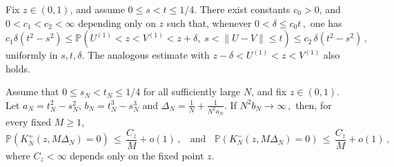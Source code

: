 \documentclass[10pt,a4paper]{amsart}
\newcommand{\PP}{\mathbb P}
\begin{document}
\begin{lemma} \label{lem:local-endpoint}
    Fix \(z\in (0,1)\), and assume \(0\le s<t\le 1/4\).  There exist constants \(c_0>0\), and \(0<c_1<c_2<\infty\) depending only on $z$ such that, whenever
    \(
        0<\delta\le c_0t \, ,
    \)
    one has
    \begin{equation} \label{eq-local-ep}
        c_1\delta(t^2-s^2)
        \le
        \PP\left(
        U^{(1)}<z<V^{(1)}<z+\delta,\;
        s<\|U-V\|\le t
        \right)
        \le
        c_2 \, \delta(t^2-s^2) \, ,
    \end{equation}
    uniformly in \(s,t,\delta\).  The analogous estimate with
    \(
        z-\delta<U^{(1)} < z < V^{(1)}
    \)
    also holds.
\end{lemma}

\begin{lemma} \label{lem:localization}
Assume that \(0\le s_N<t_N\le1/4\) for all sufficiently large \(N\), and fix \(z\in(0,1)\). Let \(a_N = t_N^2 - s_N^2 \), \(b_N = t_N^3 - s_N^3 \) and 
\(
    \Delta_N
    =
    \frac1N+\frac{1}{N^2a_N}.
\) 
If
\(
    N^2 b_N\to\infty \, ,
\)
then, for every fixed \(M\ge1\),
\[
    \PP\left(
        K_N^+(z,M\Delta_N)=0
    \right)
    \, \le \,
    \frac{C_z}{M}+o(1) \, ,
    ~~~~
    \mbox{and}
    ~~~~
    \PP\left(
        K_N^-(z,M\Delta_N)=0
    \right)
    \, \le \, 
    \frac{C_z}{M}+o(1) \, ,
\]
where \(C_z<\infty\) depends only on the fixed point \(z\).
\end{lemma}
\end{document}
